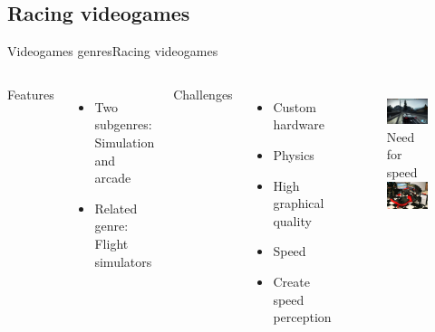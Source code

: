 \documentclass[10pt,compress]{beamer} %
\begin{document}
\subsection[Racing videogames]{Racing videogames}
\begin{frame}{Videogames genres}{Racing videogames}
	\vspace{-0.4cm}
    \begin{columns}
		Features
			\begin{itemize}
			\item Two subgenres: Simulation and arcade
			\item Related genre: Flight simulators
			\end{itemize}
	 	Challenges
			\begin{itemize}
			\item Custom hardware
			\item Physics
			\item High graphical quality
			\item Speed
			\item Create speed perception
			\end{itemize}

   	 	\begin{figure}[t]
		\begin{center}
		    \includegraphics[width=0.9\linewidth]{figs/n4s}\\Need for speed\\\smallskip
		    \includegraphics[width=0.9\linewidth]{figs/f1}
		\end{center}
   	 	\end{figure}
    \end{columns}
\end{frame}
\end{document}
